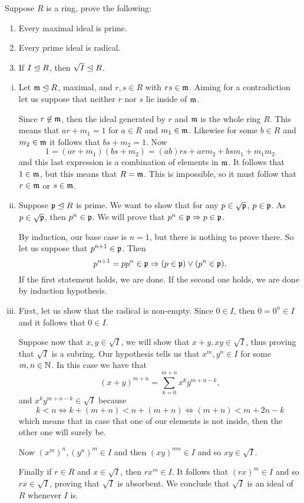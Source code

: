 \documentclass[12pt]{memoir}
\begin{document}
\begin{Ej}[2.1.1]
  Suppose $R$ is a ring, prove the following:
  \vspace{-0.4em}
  \begin{enumerate}
    \itemsep=-0.4em
    \item Every maximal ideal is prime.
    \item Every prime ideal is radical.
    \item If $I\trianglelefteq R$, then $\sqrt{I}\trianglelefteq R$.
  \end{enumerate}
\end{Ej}

\begin{ptcbr}
\begin{enumerate}[i)]
  \itemsep=-0.4em
    \item Let $\mathfrak{m}\trianglelefteq R$, maximal, and $r,s\in R$ with $rs\in\mathfrak{m}$. Aiming for a contradiction let us suppose that neither $r$ nor $s$ lie inside of $\mathfrak{m}$.\par 
    Since $r\not\in\mathfrak{m}$, then the ideal generated by $r$ and $\mathfrak{m}$ is the whole ring $R$. This means that $ar+m_1=1$ for $a\in R$ and $m_1\in\mathfrak{m}$. Likewise for some $b\in R$ and $m_2\in\mathfrak{m}$ it follows that $bs+m_2=1$. Now 
    $$1=(ar+m_1)(bs+m_2)=(ab)rs+arm_2+bsm_1+m_1m_2$$
    and this last expression is a combination of elements in $\mathfrak{m}$. It follows that $1\in\mathfrak{m}$, but this means that $R=\mathfrak{m}$. This is impossible, so it must follow that $r\in\mathfrak{m}$ or $s\in\mathfrak{m}$.
    \item Suppose $\mathfrak{p}\trianglelefteq R$ is prime. We want to show that for any $p\in\sqrt{\mathfrak{p}}$, $p\in\mathfrak{p}$. As $p\in\sqrt{\mathfrak{p}}$, then $p^n\in\mathfrak{p}$. We will prove that $p^n\in\mathfrak{p}\Rightarrow p\in\mathfrak{p}$.\par 
    By induction, our base case is $n=1$, but there is nothing to prove there. So let us suppose that $p^{n+1}\in\mathfrak{p}$. Then 
    $$p^{n+1}=pp^n\in\mathfrak{p}\Rightarrow (p\in\mathfrak{p})\lor(p^n\in\mathfrak{p}).$$
    If the first statement holds, we are done. If the second one holds, we are done by induction hypothesis.
    \item First, let us show that the radical is non-empty. Since $0\in I$, then $0=0^n\in I$ and it follows that $0\in I$.\par 
    Suppose now that $x,y\in\sqrt{I}$, we will show that $x+y, xy\in\sqrt{I}$, thus proving that $\sqrt I$ is a subring. Our hypothesis tells us that $x^m,y^n\in I$ for some $m,n\in\mathbb{N}$. In this case we have that
    $$(x+y)^{m+n}=\sum_{k=0}^{m+n}x^ky^{m+n-k},$$
    and $x^ky^{m+n-k}\in\sqrt{I}$ because 
    $$k<n\iff k+(m+n)<n+(m+n)\iff (m+n)<m+2n-k$$
    which means that in case that one of our elements is not inside, then the other one will surely be. \par 
    Now $(x^m)^n,(y^n)^m\in I$ and then $(xy)^{mn}\in I$ and so $xy\in\sqrt{I}$.\par 
    Finally if $r\in R$ and $x\in\sqrt{I}$, then $rx^m\in I$. It follows that $(rx)^m\in I$ and so $rx\in\sqrt I$, proving that $\sqrt{I}$ is absorbent. We conclude that $\sqrt{I}$ is an ideal of $R$ whenever $I$ is.
\end{enumerate}
\end{ptcbr}
\end{document}
